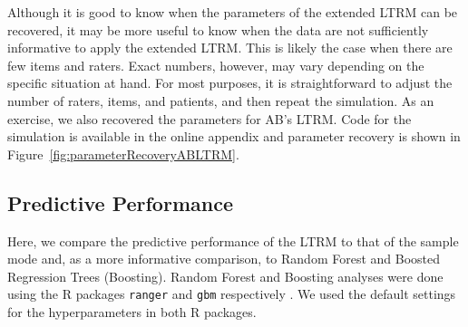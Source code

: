 \documentclass[a4paper]{article}
\newcommand{\AB}{AB}
\newcommand{\code}[1]{\texttt{#1}}
\begin{document}
Although it is good to know when the parameters of the extended LTRM can be recovered, it may be more useful to know when the data are not sufficiently informative to apply the extended LTRM. This is likely the case when there are few items and raters. Exact numbers, however, may vary depending on the specific situation at hand. For most purposes, it is straightforward to adjust the number of raters, items, and patients, and then repeat the simulation. As an exercise, we also recovered the parameters for \AB{}'s LTRM. Code for the simulation is available in the online appendix and parameter recovery is shown in Figure~\ref{fig:parameterRecoveryABLTRM}.

\subsection*{Predictive Performance}
Here, we compare the predictive performance of the LTRM to that of the sample mode and, as a more informative comparison, to Random Forest and Boosted Regression Trees (Boosting). Random Forest and Boosting analyses were done using the R packages \code{ranger} and \code{gbm} respectively \cite{ranger2017, gbmPackage}. We used the default settings for the hyperparameters in both R packages.
\end{document}

